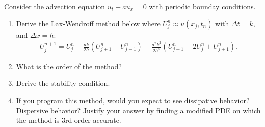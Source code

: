 \documentclass[10pt]{article}
\begin{document}
\begin{problem}
Consider the advection equation \( u_t + au_x = 0 \) with periodic bounday conditions.
\begin{enumerate}[label=(\alph*), nolistsep]
    \item Derive the Lax-Wendroff method below where \( U_j^n \approx u(x_j,t_n) \) with \( \Delta t = k \), and \( \Delta x = h \):
        \begin{align*}
            U_j^{n+1} = U_j^n - \frac{ak}{2h} (U_{j+1}^n - U_{j-1}^n) + \frac{a^2k^2}{2h^2} (U_{j-1}^n - 2U_j^n + U_{j+1}^n).
        \end{align*}
    \item What is the order of the method?
    \item Derive the stability condition.
    \item If you program this method, would you expect to see dissipative behavior? Dispersive behavior? Justify your answer by finding a modified PDE on which the method is 3rd order accurate.
\end{enumerate}
\end{problem}
\end{document}
